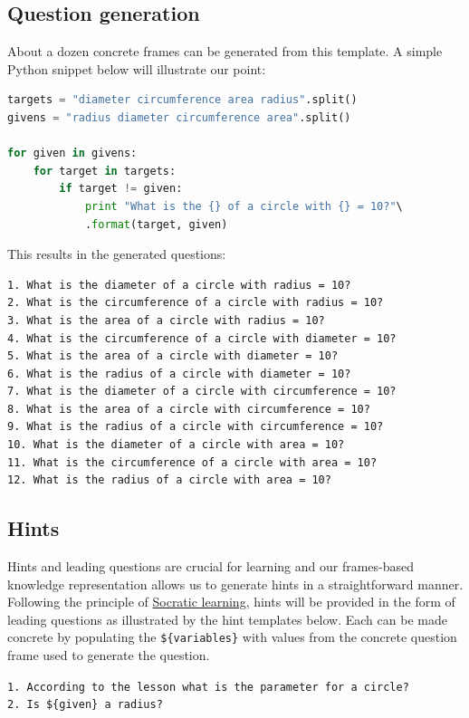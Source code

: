 \documentclass[10pt,letterpaper]{article}
\begin{document}
\subsection{Question generation}\label{qgen}
About a dozen concrete frames can be generated from this template. A simple Python snippet below will illustrate our point:
\begin{small}
\begin{lstlisting}[language=Python]
targets = "diameter circumference area radius".split()
givens = "radius diameter circumference area".split()

for given in givens:
    for target in targets:
        if target != given:
            print "What is the {} of a circle with {} = 10?"\
            .format(target, given)
\end{lstlisting} 
\end{small}

This results in the generated questions:
\begin{verbatim}
1. What is the diameter of a circle with radius = 10?
2. What is the circumference of a circle with radius = 10?
3. What is the area of a circle with radius = 10?
4. What is the circumference of a circle with diameter = 10?
5. What is the area of a circle with diameter = 10?
6. What is the radius of a circle with diameter = 10?
7. What is the diameter of a circle with circumference = 10?
8. What is the area of a circle with circumference = 10?
9. What is the radius of a circle with circumference = 10?
10. What is the diameter of a circle with area = 10?
11. What is the circumference of a circle with area = 10?
12. What is the radius of a circle with area = 10?
\end{verbatim}
\subsection{Hints}\label{hgen}
Hints and leading questions are crucial for learning and our frames-based knowledge representation allows us to generate hints in a straightforward manner. Following the principle of \href{http://www.law.uchicago.edu/prospectives/lifeofthemind/socraticmethod}{Socratic learning}, hints will be provided in the form of leading questions as illustrated by the hint templates below. Each can be made concrete by populating the {\tt \$\{variables\}} with values from the concrete question frame used to generate the question. 

{\tt 1. According to the lesson what is the parameter for a circle?} \\[0.1in]
{\tt 2. Is \$\{given\} a radius?} 
\end{document}
